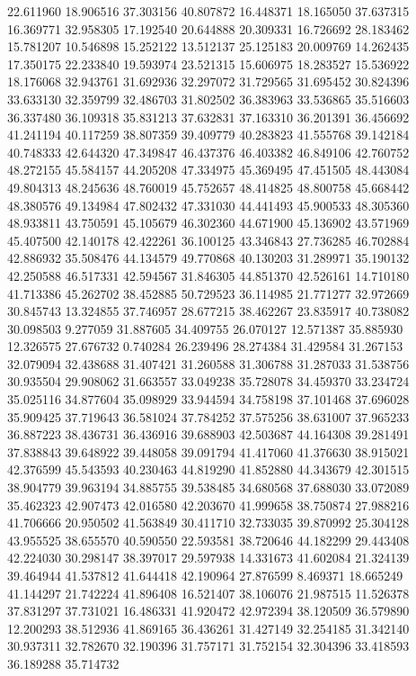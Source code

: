 22.611960
18.906516
37.303156
40.807872
16.448371
18.165050
37.637315
16.369771
32.958305
17.192540
20.644888
20.309331
16.726692
28.183462
15.781207
10.546898
15.252122
13.512137
25.125183
20.009769
14.262435
17.350175
22.233840
19.593974
23.521315
15.606975
18.283527
15.536922
18.176068
32.943761
31.692936
32.297072
31.729565
31.695452
30.824396
33.633130
32.359799
32.486703
31.802502
36.383963
33.536865
35.516603
36.337480
36.109318
35.831213
37.632831
37.163310
36.201391
36.456692
41.241194
40.117259
38.807359
39.409779
40.283823
41.555768
39.142184
40.748333
42.644320
47.349847
46.437376
46.403382
46.849106
42.760752
48.272155
45.584157
44.205208
47.334975
45.369495
47.451505
48.443084
49.804313
48.245636
48.760019
45.752657
48.414825
48.800758
45.668442
48.380576
49.134984
47.802432
47.331030
44.441493
45.900533
48.305360
48.933811
43.750591
45.105679
46.302360
44.671900
45.136902
43.571969
45.407500
42.140178
42.422261
36.100125
43.346843
27.736285
46.702884
42.886932
35.508476
44.134579
49.770868
40.130203
31.289971
35.190132
42.250588
46.517331
42.594567
31.846305
44.851370
42.526161
14.710180
41.713386
45.262702
38.452885
50.729523
36.114985
21.771277
32.972669
30.845743
13.324855
37.746957
28.677215
38.462267
23.835917
40.738082
30.098503
9.277059
31.887605
34.409755
26.070127
12.571387
35.885930
12.326575
27.676732
0.740284
26.239496
28.274384
31.429584
31.267153
32.079094
32.438688
31.407421
31.260588
31.306788
31.287033
31.538756
30.935504
29.908062
31.663557
33.049238
35.728078
34.459370
33.234724
35.025116
34.877604
35.098929
33.944594
34.758198
37.101468
37.696028
35.909425
37.719643
36.581024
37.784252
37.575256
38.631007
37.965233
36.887223
38.436731
36.436916
39.688903
42.503687
44.164308
39.281491
37.838843
39.648922
39.448058
39.091794
41.417060
41.376630
38.915021
42.376599
45.543593
40.230463
44.819290
41.852880
44.343679
42.301515
38.904779
39.963194
34.885755
39.538485
34.680568
37.688030
33.072089
35.462323
42.907473
42.016580
42.203670
41.999658
38.750874
27.988216
41.706666
20.950502
41.563849
30.411710
32.733035
39.870992
25.304128
43.955525
38.655570
40.590550
22.593581
38.720646
44.182299
29.443408
42.224030
30.298147
38.397017
29.597938
14.331673
41.602084
21.324139
39.464944
41.537812
41.644418
42.190964
27.876599
8.469371
18.665249
41.144297
21.742224
41.896408
16.521407
38.106076
21.987515
11.526378
37.831297
37.731021
16.486331
41.920472
42.972394
38.120509
36.579890
12.200293
38.512936
41.869165
36.436261
31.427149
32.254185
31.342140
30.937311
32.782670
32.190396
31.757171
31.752154
32.304396
33.418593
36.189288
35.714732
